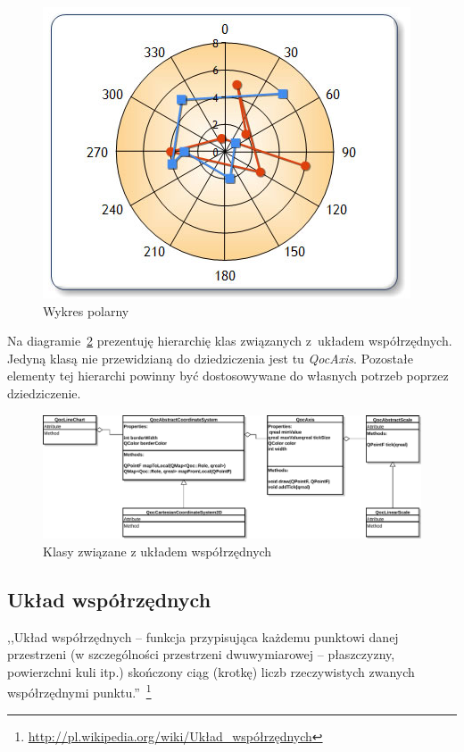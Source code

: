 \begin{figure}[H]
\centering
\includegraphics[scale=0.65]{img/biegunowy.png}
\caption{Wykres polarny}\label{rys:uk:bieg}
\end{figure}

Na diagramie~\ref{rys:os:skala} prezentuję hierarchię klas związanych z~układem współrzędnych. Jedyną klasą nie przewidzianą do dziedziczenia jest tu \textit{QocAxis}. Pozostałe elementy tej hierarchi powinny być dostosowywane do własnych potrzeb poprzez dziedziczenie.

\begin{figure}[H]
\centering
\includegraphics[scale=0.5]{img/os_skala.pdf}
\caption{Klasy związane z układem współrzędnych}\label{rys:os:skala}
\end{figure}

\subsection{Układ współrzędnych}
,,Układ współrzędnych -- funkcja przypisująca każdemu punktowi danej przestrzeni (w szczególności przestrzeni dwuwymiarowej -- płaszczyzny, powierzchni kuli itp.) skończony ciąg (krotkę) liczb rzeczywistych zwanych współrzędnymi punktu.''~\footnote{\url{http://pl.wikipedia.org/wiki/Układ\_współrzędnych}}

